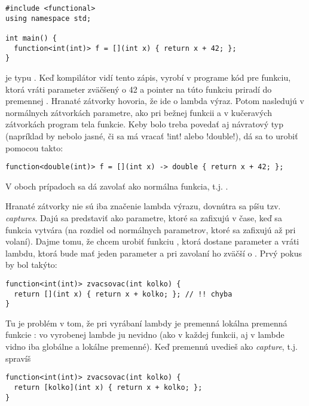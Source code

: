 {\begin{lstlisting}
#include <functional>
using namespace std;

int main() {
  function<int(int)> f = [](int x) { return x + 42; };
}
\end{lstlisting}


 je typu .
Keď kompilátor vidí tento zápis, vyrobí v programe kód pre funkciu, ktorá vráti 
parameter zväčšený o 42 a pointer na túto funkciu priradí do premennej .
Hranaté zátvorky \vb{[]} hovoria, že ide o lambda výraz. Potom nasledujú
v normálnych zátvorkách parametre, ako pri bežnej funkcii a v kučeravých zátvorkách program
tela funkcie. Keby bolo treba povedať aj návratový typ (napríklad by nebolo
jasné, či sa má vracať \prg!int! alebo \prg!double!), dá sa to urobiť pomocou \vb{->}
takto:

\begin{lstlisting}
function<double(int)> f = [](int x) -> double { return x + 42; };
\end{lstlisting}

V oboch prípadoch sa  dá zavolať ako normálna funkcia, t.j. . 

 Hranaté zátvorky nie sú iba značenie lambda výrazu, dovnútra sa píšu tzv. 
{\em captures}. Dajú sa predstaviť ako parametre, ktoré sa zafixujú v čase, keď sa
funkcia vytvára (na rozdiel od normálnych parametrov, ktoré sa zafixujú až pri volaní).
Dajme tomu, že chcem urobiť funkciu , ktorá dostane parameter 
a vráti lambdu, ktorá bude mať jeden parameter a pri zavolaní ho zväčší o .
Prvý pokus by bol takýto:

\begin{lstlisting}
function<int(int)> zvacsovac(int kolko) {
  return [](int x) { return x + kolko; }; // !! chyba
}
\end{lstlisting}

Tu je problém v tom, že pri vyrábaní lambdy je premenná  lokálna premenná
funkcie : vo vyrobenej lambde ju nevidno (ako v každej funkcii, aj 
v lambde vidno
iba globálne a lokálne premenné). Keď premennú  uvedieš ako {\em capture},
t.j. spravíš

\begin{lstlisting}
function<int(int)> zvacsovac(int kolko) {
  return [kolko](int x) { return x + kolko; };
}
\end{lstlisting}

}
